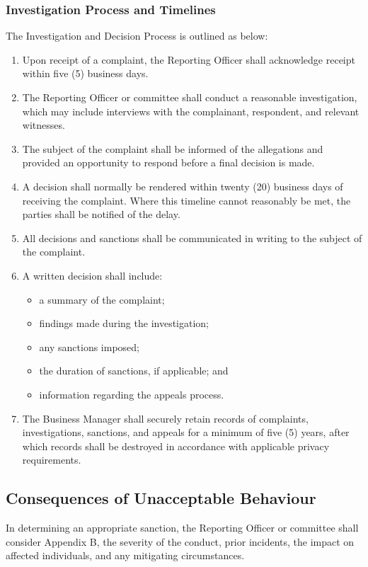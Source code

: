 \subsubsection{Investigation Process and Timelines}
The Investigation and Decision Process is outlined as below:
\begin{enumerate}
	\item Upon receipt of a complaint, the Reporting Officer shall acknowledge receipt within five (5) business days.
	\item The Reporting Officer or committee shall conduct a reasonable investigation, which may include interviews with the complainant, respondent, and relevant witnesses.
	\item The subject of the complaint shall be informed of the allegations and provided an opportunity to respond before a final decision is made.
	\item A decision shall normally be rendered within twenty (20) business days of receiving the complaint. Where this timeline cannot reasonably be met, the parties shall be notified of the delay.
	\item All decisions and sanctions shall be communicated in writing to the subject of the complaint.
	\item A written decision shall include: 
		\begin{itemize}
			\item a summary of the complaint;
			\item findings made during the investigation;
			\item any sanctions imposed;
			\item the duration of sanctions, if applicable; and
			\item information regarding the appeals process.
		\end{itemize}
	\item The Business Manager shall securely retain records of complaints, investigations, sanctions, and appeals for a minimum of five (5) years, after which records shall be destroyed in accordance with applicable privacy requirements.
\end{enumerate}

\subsection{Consequences of Unacceptable Behaviour}
In determining an appropriate sanction, the Reporting Officer or committee shall consider Appendix B, the severity of the conduct, prior incidents, the impact on affected individuals, and any mitigating circumstances.

